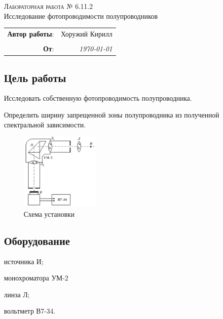 
\begin{center}
    \LARGE \textsc{Лабораторная работа № 6.11.2} \\
    \vspace{3 mm}
    \large Исследование фотопроводимости полупроводников
\end{center}


\phantom{42}

\begin{flushright}
    \begin{tabular}{rr}
        \textbf{Автор работы}: 
        & Хоружий Кирилл \\
        & \\
        \textbf{От}: &
        \textit{\today}\\
    \end{tabular}
\end{flushright}

\thispagestyle{empty}

\vspace{10mm}


\subsection*{Цель работы}
\begin{enumerate*}
    \item Исследовать собственную фотопроводимость полупроводника.
    \item Определить ширину запрещенной зоны полупроводника из полученной спектральной зависимости.

\end{enumerate*}


\vfill

\begin{figure}[h]
    \centering
    \includegraphics[width=0.35\textwidth]{exp.png}
    \caption{Схема установки}
    \label{fig:exp}
\end{figure}


\subsection*{Оборудование}

\begin{itemize*}
    \item источника И;
    \item монохроматора УМ-2 
    \item линза Л;
    \item вольтметр В7-34.
\end{itemize*}




